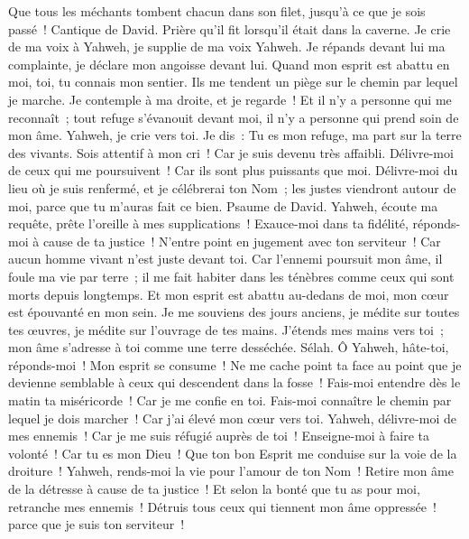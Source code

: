 \begin{multicols}{2}
Que tous les méchants tombent chacun dans son filet, jusqu'à ce que je sois passé~!
\VerseOne{}Cantique de David. Prière qu'il fit lorsqu'il était dans la caverne.
Je crie de ma voix à Yahweh, je supplie de ma voix Yahweh.
Je répands devant lui ma complainte, je déclare mon angoisse devant lui.
Quand mon esprit est abattu en moi, toi, tu connais mon sentier. Ils me tendent un piège sur le chemin par lequel je marche.
Je contemple à ma droite, et je regarde~! Et il n'y a personne qui me reconnaît~; tout refuge s'évanouit devant moi, il n'y a personne qui prend soin de mon âme.
Yahweh, je crie vers toi. Je dis~: Tu es mon refuge, ma part sur la terre des vivants.
Sois attentif à mon cri~! Car je suis devenu très affaibli. Délivre-moi de ceux qui me poursuivent~! Car ils sont plus puissants que moi.
Délivre-moi du lieu où je suis renfermé, et je célébrerai ton Nom~; les justes viendront autour de moi, parce que tu m'auras fait ce bien.
\VerseOne{}Psaume de David. Yahweh, écoute ma requête, prête l'oreille à mes supplications~! Exauce-moi dans ta fidélité, réponds-moi à cause de ta justice~!
N'entre point en jugement avec ton serviteur~! Car aucun homme vivant n'est juste devant toi.
Car l'ennemi poursuit mon âme, il foule ma vie par terre~; il me fait habiter dans les ténèbres comme ceux qui sont morts depuis longtemps.
Et mon esprit est abattu au-dedans de moi, mon cœur est épouvanté en mon sein.
Je me souviens des jours anciens, je médite sur toutes tes œuvres, je médite sur l'ouvrage de tes mains.
J'étends mes mains vers toi~; mon âme s'adresse à toi comme une terre desséchée. Sélah.
Ô Yahweh, hâte-toi, réponds-moi~! Mon esprit se consume~! Ne me cache point ta face au point que je devienne semblable à ceux qui descendent dans la fosse~!
Fais-moi entendre dès le matin ta miséricorde~! Car je me confie en toi. Fais-moi connaître le chemin par lequel je dois marcher~! Car j'ai élevé mon cœur vers toi.
Yahweh, délivre-moi de mes ennemis~! Car je me suis réfugié auprès de toi~!
Enseigne-moi à faire ta volonté~! Car tu es mon Dieu~! Que ton bon Esprit me conduise sur la voie de la droiture~!
Yahweh, rends-moi la vie pour l'amour de ton Nom~! Retire mon âme de la détresse à cause de ta justice~!
Et selon la bonté que tu as pour moi, retranche mes ennemis~! Détruis tous ceux qui tiennent mon âme oppressée~! parce que je suis ton serviteur~!

\end{multicols}
